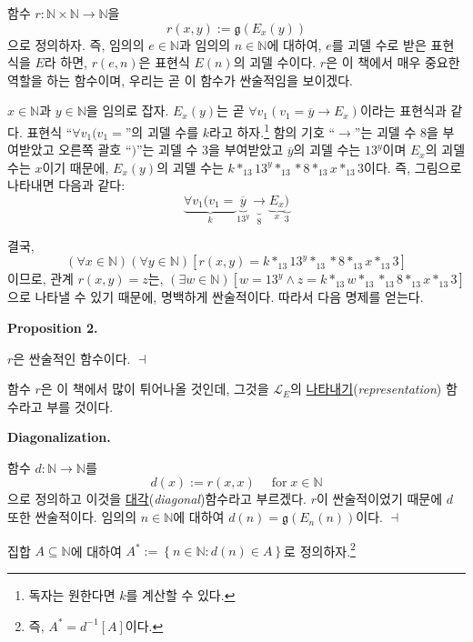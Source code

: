 \documentclass[12pt]{paper}
\newcommand{\gnum}
{ \mathfrak{g}
}
\newenvironment{context}[1][]
{ \noindent \textbf{{#1}.}
}
{ \hfill $ \dashv $
}
\begin{document}
함수 $r : \mathbb{N} \times \mathbb{N} \to \mathbb{N}$을 $$ r \left( x , y \right) := \gnum \left( E_x \left( y \right) \right) $$으로 정의하자.
즉, 임의의 $e \in \mathbb{N}$과 임의의 $n \in \mathbb{N}$에 대하여,
$e$를 괴델 수로 받은 표현식을 $E$라 하면, $r \left( e , n \right)$은 표현식 $E \left( n \right)$의 괴델 수이다.
$r$은 이 책에서 매우 중요한 역할을 하는 함수이며, 우리는 곧 이 함수가 싼술적임을 보이겠다.

$x \in \mathbb{N}$과 $y \in \mathbb{N}$을 임의로 잡자.
$E_x \left( y \right)$는 곧 $\forall v_1 \left( v_1 = \overline{y} \rightarrow E_x \right)$이라는 표현식과 같다.
표현식 ``$ \forall v_1 ( v_1 = $''의 괴델 수를 $k$라고 하자.\footnote
{
독자는 원한다면 $k$를 계산할 수 있다.
}
함의 기호 ``$\rightarrow$''는 괴델 수 $8$을 부여받았고
오른쪽 괄호 ``$)$''는 괴델 수 $3$을 부여받았고
$\overline{y}$의 괴델 수는 $13^{y}$이며 $E_x$의 괴델 수는 $x$이기 때문에,
$E_x \left( y \right)$의 괴델 수는 $k *_{13} 13^{y} *_{13} * 8 *_{13} x *_{13} 3$이다.
즉, 그림으로 나타내면 다음과 같다: $$ \underbrace{\forall v_1 ( v_1 =}_{k} \underbrace{\overline{y}}_{13^{y}} \underbrace{\rightarrow}_{8} \underbrace{E_x}_{x} \underbrace{)}_{3}$$

결국, $$\left( \forall x \in \mathbb{N} \right) \left( \forall y \in \mathbb{N} \right) \left[ r \left( x , y \right) = k *_{13} 13^{y} *_{13} * 8 *_{13} x *_{13} 3 \right]$$이므로,
관계 $r \left( x , y \right) = z$는, $\left( \exists w \in \mathbb{N} \right) \left[ w = 13^{y} \land z = k *_{13} w *_{13} *_{13} 8 *_{13} x *_{13} 3 \right]$으로 나타낼 수 있기 때문에, 명백하게 싼술적이다.
따라서 다음 명제를 얻는다.

\begin{context}[Proposition 2]
$r$은 싼술적인 함수이다.
\end{context}

함수 $r$은 이 책에서 많이 튀어나올 것인데, 그것을 $\mathcal{L}_{E}$의 \underline{나타내기}(\textit{representation}) 함수라고 부를 것이다.

\begin{context}[Diagonalization]
함수 $d : \mathbb{N} \to \mathbb{N}$를 $$d \left( x \right) := r \left( x , x \right) \quad \mathop{\mathrm{for}} x \in \mathbb{N} $$으로 정의하고
이것을 \underline{대각}(\textit{diagonal})함수라고 부르겠다.
$r$이 싼술적이었기 때문에 $d$ 또한 싼술적이다.
임의의 $n \in \mathbb{N}$에 대하여 $d \left( n \right) = \gnum \left( E_{n} \left( n \right) \right)$이다.
\end{context}

집합 $A \subseteq \mathbb{N}$에 대하여 $A^{*} := \left\{ n \in \mathbb{N} : d \left( n \right) \in A \right\}$로 정의하자.\footnote
{
즉, $A^{*} = d^{-1} \left[ A \right]$이다.
}
\end{document}
